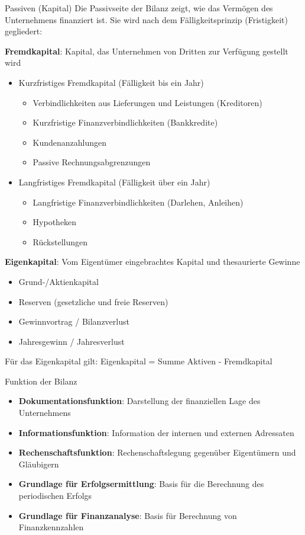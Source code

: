 \begin{definition}{Passiven (Kapital)}
Die Passivseite der Bilanz zeigt, wie das Vermögen des Unternehmens finanziert ist. Sie wird nach dem Fälligkeitsprinzip (Fristigkeit) gegliedert:

\textbf{Fremdkapital}: Kapital, das Unternehmen von Dritten zur Verfügung gestellt wird
    \begin{itemize}
        \item Kurzfristiges Fremdkapital (Fälligkeit bis ein Jahr)
        \begin{itemize}
            \item Verbindlichkeiten aus Lieferungen und Leistungen (Kreditoren)
            \item Kurzfristige Finanzverbindlichkeiten (Bankkredite)
            \item Kundenanzahlungen
            \item Passive Rechnungsabgrenzungen
        \end{itemize}
        \item Langfristiges Fremdkapital (Fälligkeit über ein Jahr)
        \begin{itemize}
            \item Langfristige Finanzverbindlichkeiten (Darlehen, Anleihen)
            \item Hypotheken
            \item Rückstellungen
        \end{itemize}
    \end{itemize}
\textbf{Eigenkapital}: Vom Eigentümer eingebrachtes Kapital und thesaurierte Gewinne
    \begin{itemize}
        \item Grund-/Aktienkapital
        \item Reserven (gesetzliche und freie Reserven)
        \item Gewinnvortrag / Bilanzverlust
        \item Jahresgewinn / Jahresverlust
    \end{itemize}

Für das Eigenkapital gilt: Eigenkapital = Summe Aktiven - Fremdkapital
\end{definition}

\begin{concept}{Funktion der Bilanz}
\begin{itemize}
    \item \textbf{Dokumentationsfunktion}: Darstellung der finanziellen Lage des Unternehmens
    \item \textbf{Informationsfunktion}: Information der internen und externen Adressaten
    \item \textbf{Rechenschaftsfunktion}: Rechenschaftslegung gegenüber Eigentümern und Gläubigern
    \item \textbf{Grundlage für Erfolgsermittlung}: Basis für die Berechnung des periodischen Erfolgs
    \item \textbf{Grundlage für Finanzanalyse}: Basis für Berechnung von Finanzkennzahlen
\end{itemize}
\end{concept}

